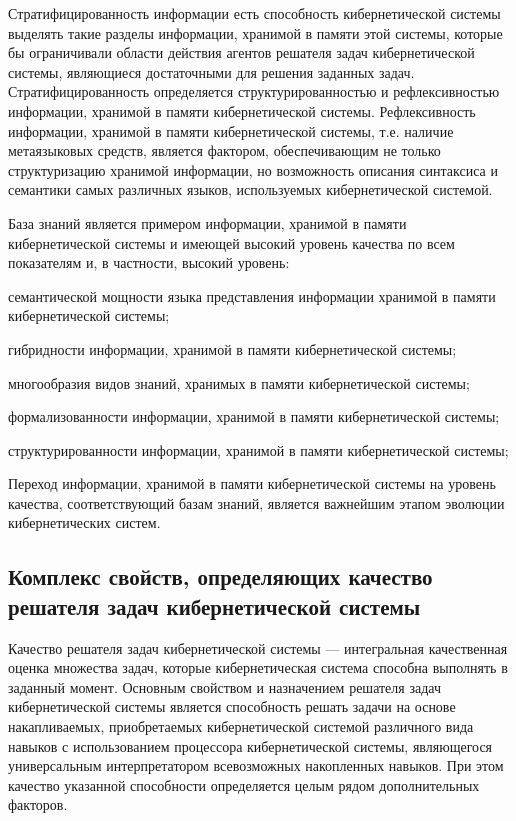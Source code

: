 Стратифицированность информации есть способность кибернетической системы выделять такие разделы информации, хранимой в памяти этой системы, которые бы ограничивали области действия агентов решателя задач кибернетической системы, являющиеся достаточными для решения заданных задач.
Стратифицированность определяется структурированностью и рефлексивностью информации, хранимой в памяти кибернетической системы.
Рефлексивность информации, хранимой в памяти кибернетической системы, т.е. наличие метаязыковых средств, является фактором, обеспечивающим не только структуризацию хранимой информации, но возможность описания синтаксиса и семантики самых различных языков, используемых кибернетической системой.

База знаний является примером информации, хранимой в памяти кибернетической системы и имеющей высокий уровень качества по всем показателям и, в частности, высокий уровень:
\begin{textitemize}
    \item семантической мощности языка представления информации хранимой в памяти кибернетической
системы;
    \item гибридности информации, хранимой в памяти кибернетической системы;
    \item многообразия видов знаний, хранимых в памяти кибернетической системы;
    \item формализованности информации, хранимой в памяти кибернетической системы;
    \item структурированности информации, хранимой в памяти кибернетической системы;
\end{textitemize}

Переход информации, хранимой в памяти кибернетической системы на уровень качества, соответствующий базам знаний, является важнейшим этапом эволюции кибернетических систем.


\subsection{Комплекс свойств, определяющих качество решателя задач кибернетической системы}
{\label{sec_cyb_syst_problem_solver_quality}} 

Качество решателя задач кибернетической системы --- интегральная качественная оценка множества задач, которые кибернетическая система способна выполнять в заданный момент.
Основным свойством и назначением решателя задач кибернетической системы является способность решать задачи на основе накапливаемых, приобретаемых кибернетической системой различного вида навыков с использованием процессора кибернетической системы, являющегося универсальным интерпретатором всевозможных накопленных навыков. 
При этом качество указанной способности определяется целым рядом дополнительных факторов.

